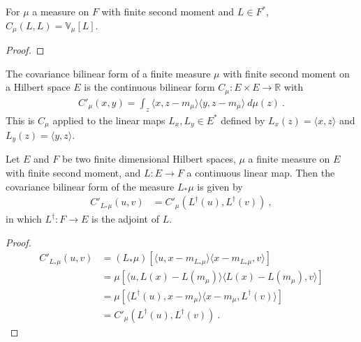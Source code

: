 \begin{lemma}\label{lem:covarianceBilin_same_eq_variance}
  \mathlibok
For $\mu$ a measure on $F$ with finite second moment and $L \in F^*$, $C_\mu(L, L) = \mathbb{V}_\mu[L]$.
\end{lemma}

\begin{proof}\leanok

\end{proof}


\begin{definition}\label{def:covInnerBilin}
  \leanok
The covariance bilinear form of a finite measure $\mu$ with finite second moment on a Hilbert space $E$ is the continuous bilinear form $C_\mu : E \times E \to \mathbb{R}$ with
\begin{align*}
  C'_\mu(x, y) = \int_z \langle x, z - m_\mu \rangle \langle y, z - m_\mu \rangle \: d\mu(z) \: .
\end{align*}
This is $C_\mu$ applied to the linear maps $L_x, L_y \in E^*$ defined by $L_x(z) = \langle x, z \rangle$ and $L_y(z) = \langle y, z \rangle$.
\end{definition}


\begin{lemma}\label{lem:covInnerBilin_map}
  \leanok
Let $E$ and $F$ be two finite dimensional Hilbert spaces, $\mu$ a finite measure on $E$ with finite second moment, and $L : E \to F$ a continuous linear map.
Then the covariance bilinear form of the measure $L_*\mu$ is given by
\begin{align*}
  C'_{L_*\mu}(u, v)
  &= C'_\mu(L^\dagger(u), L^\dagger(v))
  \: ,
\end{align*}
in which $L^\dagger : F \to E$ is the adjoint of $L$.
\end{lemma}

\begin{proof}
\begin{align*}
  C'_{L_*\mu}(u, v)
  &= (L_*\mu)\left[\langle u, x - m_{L_*\mu}\rangle \langle x - m_{L_*\mu}, v \rangle\right]
  \\
  &= \mu\left[\langle u, L(x) - L(m_\mu)\rangle \langle L(x) - L(m_\mu), v \rangle \right]
  \\
  &= \mu\left[\langle L^\dagger(u), x - m_\mu\rangle \langle x - m_\mu, L^\dagger(v) \rangle \right]
  \\
  &= C'_\mu(L^\dagger(u), L^\dagger(v))
  \: .
\end{align*}
\end{proof}


